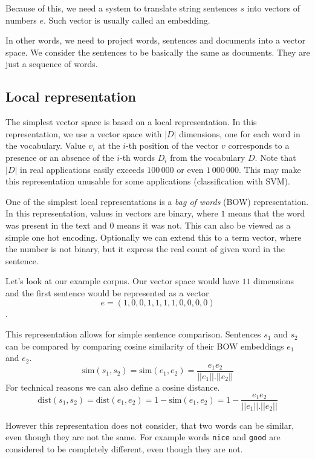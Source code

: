     Because of this, we need a system to translate string sentences $s$ into vectors of numbers $e$.
    Such vector is usually called an embedding. 
    
    In  other words, we need to project words, sentences and documents into a vector space.
    We consider the sentences to be basically the same as documents. 
    They are just a sequence of words.
    
    \subsection{Local representation} \label{sec:local:representation}
    
    The simplest vector space is based on a local representation.
    In this representation, we use a vector space with $|D|$ dimensions, one for each word in the vocabulary.
    Value $v_i$ at the $i$-th position of the vector $v$ corresponds to a presence or an absence of the $i$-th words $D_i$ from the vocabulary $D$.
    Note that $|D|$ in real applications easily exceeds $100\,000$ or even $1\,000\,000$.
    This may make this representation unusable for some applications (classification with SVM).
    
    One of the simplest local representations is a \textit{bag of words} (BOW) representation. 
    In this representation, values in vectors are binary, where $1$ means that the word was present in the text and $0$ means it was not.
    This can also be viewed as a simple one hot encoding.
    Optionally we can extend this to a term vector, where the number is not binary, but it express the real count of given word in the sentence.
    
    Let's look at our example corpus. 
    Our vector space would have $11$ dimensions and the first sentence would be represented as a vector
    $$e = (1, 0, 0, 1, 1, 1, 1, 0, 0, 0, 0)$$.
    
    This representation allows for simple sentence comparison. 
    Sentences $s_1$ and $s_2$ can be compared by comparing cosine similarity of their BOW embeddings $e_1$ and $e_2$.
    $$\mathrm{sim}(s_1, s_2) = \mathrm{sim}(e_1, e_2) = \frac{e_1 e_2}{||e_1||.||e_2||}$$
    For technical reasons we can also define a cosine distance. 
    $$\mathrm{dist}(s_1, s_2) = \mathrm{dist}(e_1, e_2) = 1- \mathrm{sim}(e_1, e_2) = 1 - \frac{e_1 e_2}{||e_1||.||e_2||}$$
    
    However this representation does not consider, that two words can be similar, even though they are not the same.
    For example words \texttt{nice} and \texttt{good} are considered to be completely different, even though they are not. 
    
